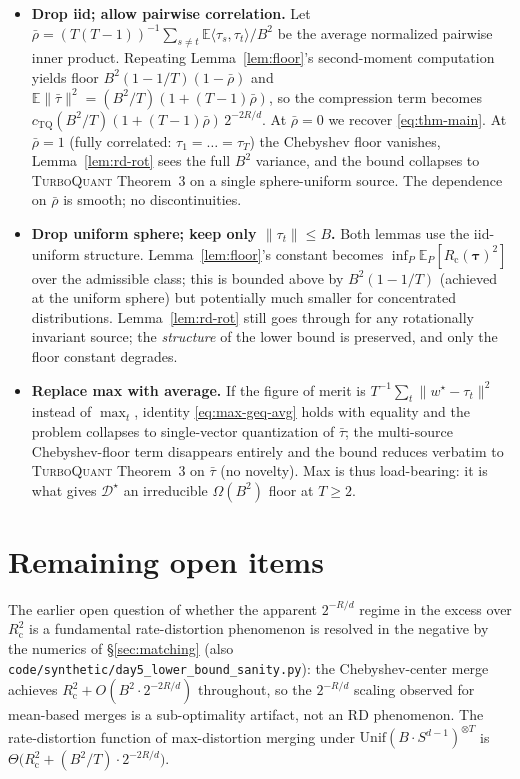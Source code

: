 \documentclass{article}
\theoremstyle{remark}
\newcommand{\E}{\mathbb{E}}
\newcommand{\cheb}{R_{\mathrm{c}}}
\begin{document}
\begin{itemize}
  \item \textbf{Drop iid; allow pairwise correlation.} Let $\bar\rho =
  (T(T-1))^{-1}\sum_{s\neq t}\E\langle\tau_s,\tau_t\rangle / B^2$ be the
  average normalized pairwise inner product. Repeating
  Lemma~\ref{lem:floor}'s second-moment computation yields floor
  $B^2(1-1/T)(1-\bar\rho)$ and $\E\|\bar\tau\|^2 = (B^2/T)(1 + (T-1)\bar
  \rho)$, so the compression term becomes $c_{\mathrm{TQ}}(B^2/T)
  (1+(T-1)\bar\rho)\,2^{-2R/d}$. At $\bar\rho = 0$ we recover
  \eqref{eq:thm-main}. At $\bar\rho = 1$ (fully correlated: $\tau_1 =
  \dots = \tau_T$) the Chebyshev floor vanishes, Lemma~\ref{lem:rd-rot}
  sees the full $B^2$ variance, and the bound collapses to
  \textsc{TurboQuant} Theorem~3 on a single sphere-uniform source. The
  dependence on $\bar\rho$ is smooth; no discontinuities.
  \item \textbf{Drop uniform sphere; keep only $\|\tau_t\|\leq B$.} Both
  lemmas use the iid-uniform structure. Lemma~\ref{lem:floor}'s
  constant becomes $\inf_P \E_P[\cheb(\boldsymbol\tau)^2]$ over the
  admissible class; this is bounded above by $B^2(1-1/T)$ (achieved at
  the uniform sphere) but potentially much smaller for concentrated
  distributions. Lemma~\ref{lem:rd-rot} still goes through for any
  rotationally invariant source; the \emph{structure} of the lower
  bound is preserved, and only the floor constant degrades.
  \item \textbf{Replace max with average.} If the figure of merit is
  $T^{-1}\sum_t\|w^\star-\tau_t\|^2$ instead of $\max_t$, identity
  \eqref{eq:max-geq-avg} holds with equality and the problem collapses
  to single-vector quantization of $\bar\tau$; the multi-source
  Chebyshev-floor term disappears entirely and the bound reduces
  verbatim to \textsc{TurboQuant} Theorem~3 on $\bar\tau$ (no novelty).
  Max is thus load-bearing: it is what gives
  $\mathcal{D}^\star$ an irreducible $\Omega(B^2)$ floor at $T\geq 2$.
\end{itemize}

\section{Remaining open items}\label{sec:open}

The earlier open question of whether the apparent $2^{-R/d}$ regime
in the excess over $\cheb^2$ is a fundamental rate-distortion
phenomenon is resolved in the negative by the numerics of
\S\ref{sec:matching} (also
\texttt{code/synthetic/day5\_lower\_bound\_sanity.py}): the
Chebyshev-center merge achieves $\cheb^2 + O(B^2 \cdot 2^{-2R/d})$
throughout, so the $2^{-R/d}$ scaling observed for mean-based merges
is a sub-optimality artifact, not an RD phenomenon. The
rate-distortion function of max-distortion merging under
$\mathrm{Unif}(B\cdot S^{d-1})^{\otimes T}$ is
$\Theta\bigl(\cheb^2 + (B^2/T)\cdot 2^{-2R/d}\bigr)$.
\end{document}
